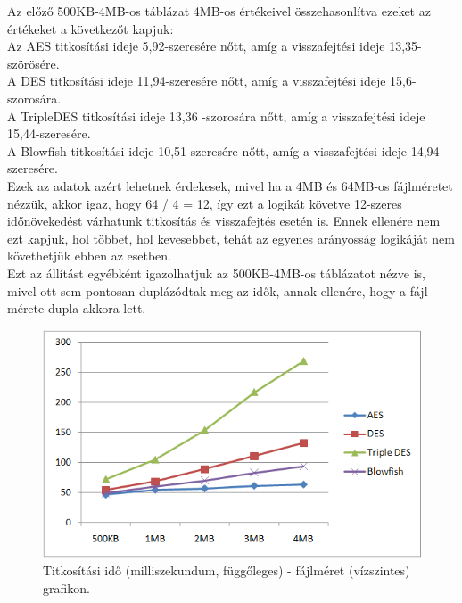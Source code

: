 Az előző 500KB-4MB-os táblázat 4MB-os értékeivel összehasonlítva ezeket az értékeket a következőt kapjuk:
\vspace{5pt}\\Az AES titkosítási ideje 5,92-szeresére nőtt, amíg a visszafejtési ideje 13,35-szörösére.
\vspace{5pt}\\A DES titkosítási ideje 11,94-szeresére nőtt, amíg a visszafejtési ideje 15,6-szorosára.
\vspace{5pt}\\A TripleDES titkosítási ideje 13,36 -szorosára nőtt, amíg a visszafejtési ideje 15,44-szeresére.
\vspace{5pt}\\A Blowfish titkosítási ideje 10,51-szeresére nőtt, amíg a visszafejtési ideje 14,94- szeresére.
\vspace{5pt}\\Ezek az adatok azért lehetnek érdekesek, mivel ha a 4MB és 64MB-os fájlméretet nézzük, akkor igaz, hogy 64 / 4 = 12, így ezt a logikát követve 12-szeres időnövekedést várhatunk titkosítás és visszafejtés esetén is. Ennek ellenére nem ezt kapjuk, hol többet, hol kevesebbet, tehát az egyenes arányosság logikáját nem követhetjük ebben az esetben. 
\vspace{5pt}\\Ezt az állítást egyébként igazolhatjuk az 500KB-4MB-os táblázatot nézve is, mivel ott sem pontosan duplázódtak meg az idők, annak ellenére, hogy a fájl mérete dupla akkora lett.


\begin{figure}[h]
	\centering
	\includegraphics[scale=0.8]{images/alg_graf_1.png}
	\caption{Titkosítási idő (milliszekundum, függőleges) - fájlméret (vízszintes) grafikon.}
	\label{fig:alg_titkositas_graf}
\end{figure}

